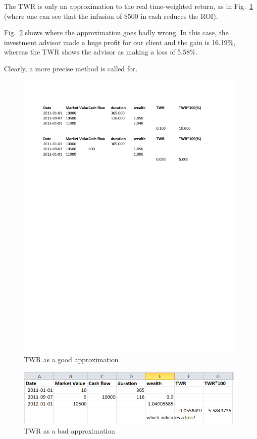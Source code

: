 \documentclass[runningheads,12pt]{article}
\begin{document}
The TWR is only an approximation to the real time-weighted return, as in  Fig.~\ref{fig:twr} (where one can see that the infusion of \$500 in cash reduces the ROI). 

Fig.~\ref{fig:bad-twr} shows where the approximation goes badly wrong. In this case, the investment advisor made a huge profit for our client and the gain is 16.19\%, whereas the TWR shows the advisor as making a loss of 5.58\%.

Clearly, a more precise method is called for. 



\begin{figure}[!]
\centering
\includegraphics[scale=0.8]{inputs/twr.pdf}
\caption{TWR as a good approximation}
\label{fig:twr}
\end{figure}

\begin{figure}[!]
\centering
\includegraphics[scale=2.3]{inputs/bad-twr.png}
\caption{TWR as a bad approximation}
\label{fig:bad-twr}
\end{figure}
\end{document}
